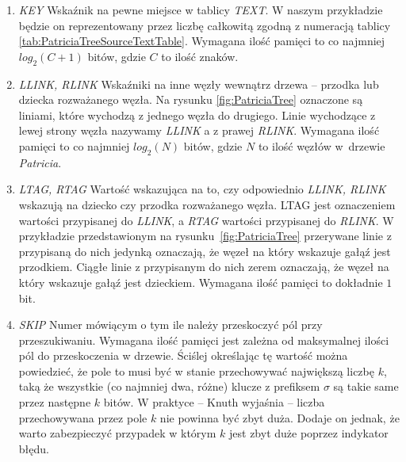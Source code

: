 	\begin{enumerate}
		\item \emph{KEY} \newline
		Wskaźnik na pewne miejsce w tablicy \emph{TEXT}. W naszym przykładzie będzie on reprezentowany przez liczbę całkowitą zgodną z numeracją tablicy \ref{tab:PatriciaTreeSourceTextTable}. \newline
		Wymagana ilość pamięci to co najmniej $log_2(C+1)$ bitów, gdzie $C$ to ilość znaków. \newline
		
		\item \emph{LLINK, RLINK} \newline
		Wskaźniki na inne węzły wewnątrz drzewa -- przodka lub dziecka rozważanego węzła. Na rysunku \ref{fig:PatriciaTree} oznaczone są liniami, które wychodzą z jednego węzła do drugiego. Linie wychodzące z lewej strony węzła nazywamy \emph{LLINK} a z prawej \emph{RLINK}. \newline
		Wymagana ilość pamięci to co najmniej $log_2(N)$ bitów, gdzie $N$ to ilość węzłów w~drzewie \emph{Patricia}.\newline
		
		\item \emph{LTAG, RTAG} \newline
		Wartość wskazująca na to, czy odpowiednio \emph{LLINK, RLINK} wskazują na dziecko czy przodka rozważanego węzła. LTAG jest oznaczeniem wartości przypisanej do \emph{LLINK}, a \emph{RTAG} wartości przypisanej do \emph{RLINK}. W przykładzie przedstawionym na rysunku~\ref{fig:PatriciaTree} przerywane linie z przypisaną do nich jedynką oznaczają, że węzeł na który wskazuje gałąź jest przodkiem. Ciągłe linie z przypisanym do nich zerem oznaczają, że węzeł na który wskazuje gałąź jest dzieckiem. \newline
		Wymagana ilość pamięci to dokładnie $1$ bit.\newline
		
		\item \emph{SKIP} \newline
		Numer mówiącym o tym ile należy przeskoczyć pól przy przeszukiwaniu. \newline
		Wymagana ilość pamięci jest zależna od maksymalnej ilości pól do przeskoczenia w drzewie. Ściślej określając tę wartość można powiedzieć, że pole to musi być w stanie przechowywać największą liczbę $k$, taką że wszystkie (co najmniej dwa, różne) klucze z prefiksem $\sigma$ są takie same przez następne $k$ bitów. \newline
		W praktyce -- Knuth wyjaśnia -- liczba przechowywana przez pole $k$ nie powinna być zbyt duża. Dodaje on jednak, że warto zabezpieczyć przypadek w którym $k$ jest zbyt duże poprzez indykator błędu.\newline
	\end{enumerate}

